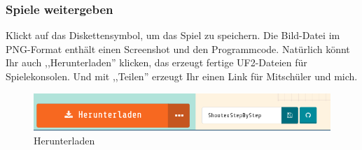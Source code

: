 \documentclass{beamer}
\begin{document}
 \begin{frame}
 \frametitle{Spiele weitergeben}
Klickt auf das Diskettensymbol, um das Spiel zu speichern. Die Bild-Datei im PNG-Format enthält einen Screenshot und den Programmcode. Natürlich könnt Ihr auch ,,Herunterladen'' klicken, das erzeugt fertige UF2-Dateien für Spielekonsolen. Und mit ,,Teilen'' erzeugt Ihr einen Link für Mitschüler und mich. 
 
 \begin{figure}
  \includegraphics[width=13cm]{game18.png}
  \caption{Herunterladen}
  \label{fig:game4}
\end{figure}
\end{frame}
\end{document}
